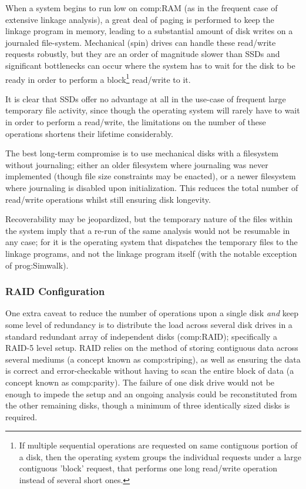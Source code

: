 When a system begins to run low on \gls{comp:RAM} (as in the frequent case of extensive linkage analysis), a great deal of paging is performed to keep the linkage program in memory, leading to a substantial amount of disk writes on a journaled file-system. Mechanical (spin) drives can handle these read/write requests robustly, but they are an order of magnitude slower than SSDs and significant bottlenecks can occur where the system has to wait for the disk to be ready in order to perform a block\footnote{If multiple sequential operations are requested on same contiguous portion of a disk, then the operating system groups the individual requests under a large contiguous 'block' request, that performs one long read/write operation instead of several short ones.}    read/write to it.

It is clear that SSDs offer no advantage at all in the use-case of frequent large temporary file activity, since though the operating system will rarely have to wait in order to perform a read/write, the limitations on the number of these operations shortens their lifetime considerably.

The best long-term compromise is to use mechanical disks with a filesystem without journaling; either an older filesystem where journaling was never implemented (though file size constraints may be enacted), or a newer filesystem where journaling is disabled upon initialization. This reduces the total number of read/write operations whilst still ensuring disk longevity.

Recoverability may be jeopardized, but the temporary nature of the files within the system imply that a re-run of the same analysis would not be resumable in any case; for it is the operating system that dispatches the temporary files to the linkage programs, and not the linkage program itself (with the  notable exception of \gls{prog:Simwalk}).


\subsubsection{RAID Configuration}

One extra caveat to reduce the number of operations upon a single disk \textit{and} keep some level of redundancy is to distribute the load across several disk drives in a standard redundant array of independent disks (\gls{comp:RAID}); specifically a RAID-5 level setup. RAID relies on the method of storing contiguous data across several mediums (a concept known as \gls{comp:striping}), as well as ensuring the data is correct and error-checkable without having to scan the entire block of data (a concept known as \gls{comp:parity}). The failure of one disk drive would not be enough to impede the setup and an ongoing analysis could be reconstituted from the other remaining disks, though a minimum of three identically sized disks is required.

